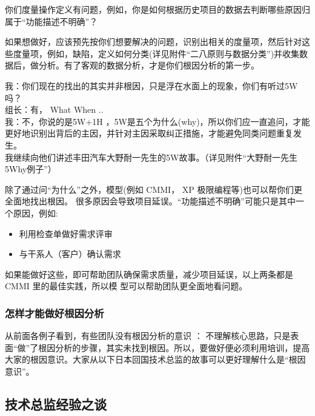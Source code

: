 你们度量操作定义有问题，例如，你是如何根据历史项目的数据去判断哪些原因归属于``功能描述不明确''？

如果想做好，应该预先按你们想要解决的问题，识别出相关的度量项，然后针对这些度量项，例如，缺陷，定义如何分类(详见附件``二八原则与数据分类'')并收集数据后，做分析。有了客观的数据分析，才是你们根因分析的第一步。

\begin{description}
\item[]
\begin{description}
\tightlist
\item[]
= = =
\end{description}
\end{description}

我：你们现在的找出的其实并非根因，只是浮在水面上的现象，你们有听过5W吗？\\
组长：有， What When ..\\
我：不，你说的是5W+1H
，5W是五个为什么(why)，所以你们应一直追问，才能更好地识别出背后的主因，并针对主因采取纠正措施，才能避免同类问题重复发生。\\
我继续向他们讲述丰田汽车大野耐一先生的5W故事。（详见附件``大野耐一先生5Why例子''）

除了通过问``为什么''之外，模型(例如 CMMI， XP
极限编程等)也可以帮你们更全面地找出根因。
很多原因会导致项目延误。``功能描述不明确''可能只是其中一个原因，例如:

\begin{itemize}
\tightlist
\item
  利用检查单做好需求评审
\item
  与干系人（客户）确认需求
\end{itemize}

如果能做好这些，即可帮助团队确保需求质量，减少项目延误，以上两条都是
CMMI 里的最佳实践，所以模 型可以帮助团队更全面地看问题。

\hypertarget{ux600eux6837ux624dux80fdux505aux597dux6839ux56e0ux5206ux6790}{%
\subsubsection{怎样才能做好根因分析}\label{ux600eux6837ux624dux80fdux505aux597dux6839ux56e0ux5206ux6790}}

从前面各例子看到，有些团队没有根因分析的意识 ：
不理解核心思路，只是表面``做''了根因分析的步骤，其实未找到根因。所以，要做好便必须利用培训，提高大家的根因意识。大家从以下日本回国技术总监的故事可以更好理解什么是``根因意识''。

\hypertarget{ux6280ux672fux603bux76d1ux7ecfux9a8cux4e4bux8c08}{%
\subsection{技术总监经验之谈}\label{ux6280ux672fux603bux76d1ux7ecfux9a8cux4e4bux8c08}}

